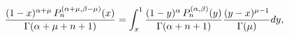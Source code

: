 \[\frac{(1-x)^{\alpha+\mu}\mathop{P^{(\alpha+\mu,\beta-\mu)}_{n}\/}\nolimits\!%
\left(x\right)}{\mathop{\Gamma\/}\nolimits\!\left(\alpha+\mu+n+1\right)}=\int_%
{x}^{1}\frac{(1-y)^{\alpha}\mathop{P^{(\alpha,\beta)}_{n}\/}\nolimits\!\left(y%
\right)}{\mathop{\Gamma\/}\nolimits\!\left(\alpha+n+1\right)}\frac{(y-x)^{\mu-%
1}}{\mathop{\Gamma\/}\nolimits\!\left(\mu\right)}dy,\]